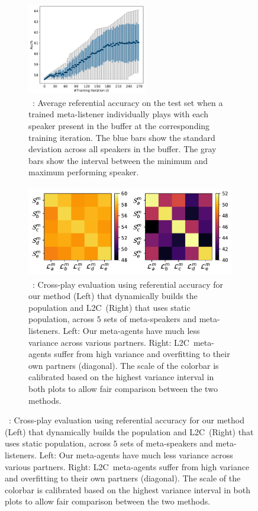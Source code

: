 \documentclass{article}
\newcommand{\ltc}{\textsc{L2C\xspace}}
\newcommand\newsubcap[1]{\phantomcaption%
       \caption*{\figurename~\thefigure\thesubfigure: #1}}
\begin{document}
\begin{figure}
    \centering
    \begin{subfigure}{0.45\textwidth}
    \centering
    \includegraphics[width=0.98\linewidth, height=4cm]{figs/meta-listener-diversity.pdf}
    \newsubcap{Average referential accuracy on the test set when a trained meta-listener individually plays with each speaker present in the buffer at the corresponding training iteration. The blue bars show the standard deviation across all speakers in the buffer. The gray bars show the interval between the minimum and maximum performing speaker.}
    \label{fig:meta-listener-diversity}
    \end{subfigure}
    \hfill
    \begin{subfigure}{0.53\textwidth}
    \centering
    \includegraphics[width=0.98\linewidth, height=4cm]{figs/static-dynamic.pdf}
    \newsubcap{Cross-play evaluation using referential accuracy for our method (Left) that dynamically builds the population and \ltc\ (Right) that uses static population, across $5$ sets of meta-speakers and meta-listeners. Left: Our meta-agents have much less variance across various partners. Right: \ltc\ meta-agents suffer from high variance and overfitting to their own partners (diagonal). The scale of the colorbar is calibrated based on the highest variance interval in both plots to allow fair comparison between the two methods.}
    \label{fig:static-dynamic-var}
    \end{subfigure}
\end{figure}
\end{document}
